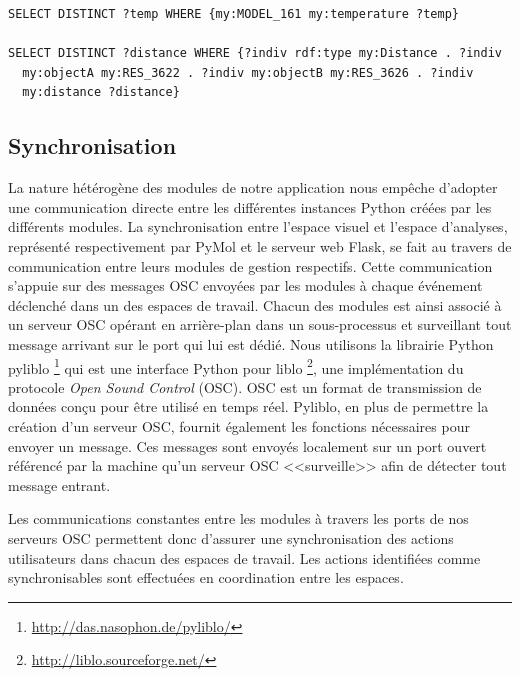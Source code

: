 \begin{lstlisting}[language=XML, caption=Deux requêtes SPARQL : 1. Accès à la température d'un modèle 2. Accès à la distance entre deux résidus, label=sparql_simple_vs_complexe]
SELECT DISTINCT ?temp WHERE {my:MODEL_161 my:temperature ?temp}

SELECT DISTINCT ?distance WHERE {?indiv rdf:type my:Distance . ?indiv 
  my:objectA my:RES_3622 . ?indiv my:objectB my:RES_3626 . ?indiv 
  my:distance ?distance}
\end{lstlisting}

\subsection{Synchronisation}

La nature hétérogène des modules de notre application nous empêche d'adopter une communication directe entre les différentes instances Python créées par les différents modules. La synchronisation entre l'espace visuel et l'espace d'analyses, représenté respectivement par PyMol et le serveur web Flask, se fait au travers de communication entre leurs modules de gestion respectifs. Cette communication s'appuie sur des messages OSC envoyées par les modules à chaque événement déclenché dans un des espaces de travail. Chacun des modules est ainsi associé à un serveur OSC opérant en arrière-plan dans un sous-processus et surveillant tout message arrivant sur le port qui lui est dédié. Nous utilisons la librairie Python pyliblo \footnote{\url{http://das.nasophon.de/pyliblo/}} qui est une interface Python pour liblo \footnote{\url{http://liblo.sourceforge.net/}}, une implémentation du protocole \textit{Open Sound Control} (OSC). OSC est un format de transmission de données conçu pour être utilisé en temps réel. Pyliblo, en plus de permettre la création d'un serveur OSC, fournit également les fonctions nécessaires pour envoyer un message. Ces messages sont envoyés localement sur un port ouvert référencé par la machine qu'un serveur OSC <<surveille>> afin de détecter tout message entrant.

Les communications constantes entre les modules à travers les ports de nos serveurs OSC permettent donc d'assurer une synchronisation des actions utilisateurs dans chacun des espaces de travail. Les actions identifiées comme synchronisables sont effectuées en coordination entre les espaces.

